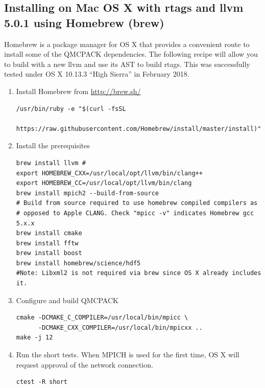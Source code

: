 \subsection{Installing on Mac OS X with rtags and llvm 5.0.1 using Homebrew (brew)}
Homebrew is a package manager for OS X that provides a convenient
route to install some of the QMCPACK dependencies. The
following recipe will allow you to build with a new llvm and use its AST to build rtags.
This was successfully tested under OS X 10.13.3 ``High Sierra'' in February 2018.

\begin{enumerate}
\item Install Homebrew from \url{http://brew.sh/}
\begin{verbatim}
/usr/bin/ruby -e "$(curl -fsSL
    https://raw.githubusercontent.com/Homebrew/install/master/install)"
\end{verbatim}

\item Install the prerequisites
\begin{verbatim}
brew install llvm # 
export HOMEBREW_CXX=/usr/local/opt/llvm/bin/clang++
export HOMEBREW_CC=/usr/local/opt/llvm/bin/clang
brew install mpich2 --build-from-source
# Build from source required to use homebrew compiled compilers as
# opposed to Apple CLANG. Check "mpicc -v" indicates Homebrew gcc 5.x.x
brew install cmake
brew install fftw
brew install boost
brew install homebrew/science/hdf5
#Note: Libxml2 is not required via brew since OS X already includes it.
\end{verbatim}
\item Configure and build QMCPACK
\begin{verbatim}
cmake -DCMAKE_C_COMPILER=/usr/local/bin/mpicc \
      -DCMAKE_CXX_COMPILER=/usr/local/bin/mpicxx ..
make -j 12
\end{verbatim}
\item Run the short tests. When MPICH is used for the first time, OS
  X will request approval of the network connection.
\begin{verbatim}
ctest -R short
\end{verbatim}
\end{enumerate}

